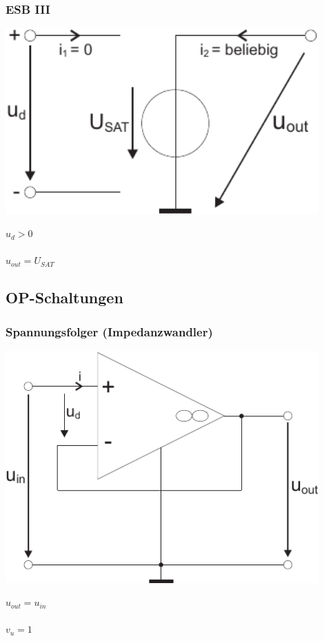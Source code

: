 \documentclass[a4paper,twocolumn,10pt]{article}
\begin{document}
\subsubsection*{ESB III}
\begin{minipage}[b]{0.3\textwidth}
\includegraphics[width=0.9\textwidth]{img/OP_ESBIII}
\end{minipage}
\hfill
\begin{minipage}[b]{0.16\textwidth}
$u_d>0$\\\\
$u_{out}=U_{SAT}$
\end{minipage}

\subsection*{OP-Schaltungen}
\subsubsection*{Spannungsfolger (Impedanzwandler)}
\begin{minipage}[b]{0.3\textwidth}
\includegraphics[width=0.9\textwidth]{img/OP_SF}
\end{minipage}
\hfill
\begin{minipage}[b]{0.16\textwidth}
$u_{out}=u_{in}$\\\\
$v_u=1$
\end{minipage}
\end{document}

